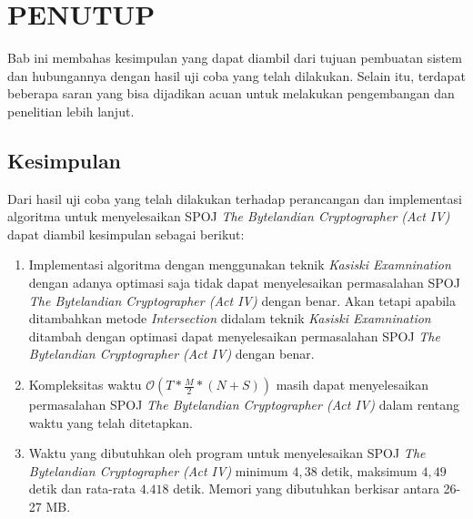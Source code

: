 \chapter{PENUTUP}
  Bab ini membahas kesimpulan yang dapat diambil dari tujuan pembuatan sistem dan hubungannya dengan hasil uji coba yang telah dilakukan. Selain itu, terdapat beberapa saran yang bisa dijadikan acuan untuk melakukan pengembangan dan penelitian lebih lanjut.
  \section{Kesimpulan}
 Dari hasil uji coba yang telah dilakukan terhadap perancangan dan implementasi algoritma untuk menyelesaikan SPOJ \textit{The Bytelandian Cryptographer (Act IV)} dapat diambil kesimpulan sebagai berikut:
 
 \begin{enumerate}
 \item Implementasi algoritma dengan menggunakan teknik \textit{Kasiski Examnination} dengan adanya optimasi saja tidak dapat menyelesaikan permasalahan SPOJ \textit{The Bytelandian Cryptographer (Act IV)} dengan benar. Akan tetapi apabila ditambahkan metode \textit{Intersection} didalam teknik \textit{Kasiski Examnination} ditambah dengan optimasi dapat menyelesaikan permasalahan SPOJ \textit{The Bytelandian Cryptographer (Act IV)} dengan benar.
 \item Kompleksitas waktu $\mathcal{O}(T*\frac{M}{2}*(N+S))$ masih dapat menyelesaikan permasalahan SPOJ \textit{The Bytelandian Cryptographer (Act IV)} dalam rentang waktu yang telah ditetapkan.
 \item Waktu yang dibutuhkan oleh program untuk menyelesaikan SPOJ \textit{The Bytelandian Cryptographer (Act IV)} minimum $4,38$ detik, maksimum $4,49$ detik dan rata-rata $4.418$ detik. Memori yang dibutuhkan berkisar antara 26-27 MB. %
 \end{enumerate}
  
